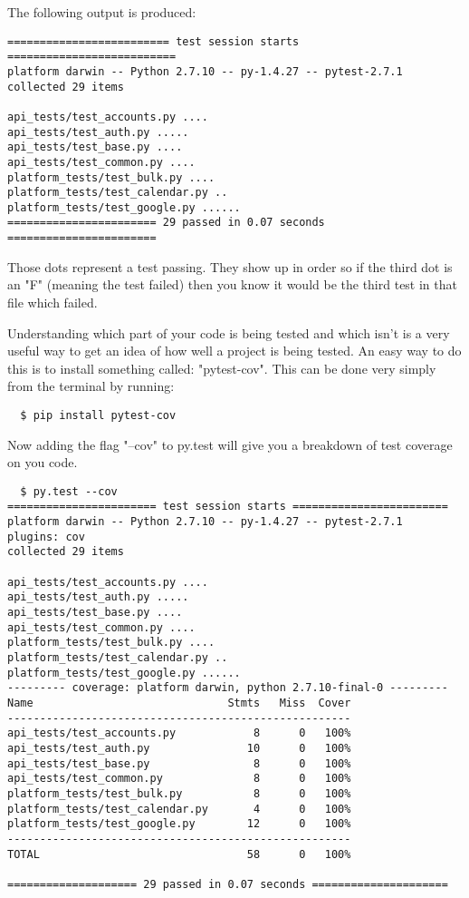 \documentclass[nociteref]{../../SIAM-GH-book}
\begin{document}
The following output is produced:

\begin{lstlisting}
========================= test session starts ==========================
platform darwin -- Python 2.7.10 -- py-1.4.27 -- pytest-2.7.1
collected 29 items

api_tests/test_accounts.py ....
api_tests/test_auth.py .....
api_tests/test_base.py ....
api_tests/test_common.py ....
platform_tests/test_bulk.py ....
platform_tests/test_calendar.py ..
platform_tests/test_google.py ......
======================= 29 passed in 0.07 seconds =======================
\end{lstlisting}
\begin{info}
Those dots represent a test passing. They show up in order so if the third dot is an "F" (meaning the test failed) then you know it would be the third test in that file which failed.
\end{info}

Understanding which part of your code is being tested and which isn't is a very useful way to get an idea of how well a project is being tested.
An easy way to do this is to install something called: "pytest-cov". This can be done very simply from the terminal by running:
\begin{lstlisting}
  $ pip install pytest-cov
\end{lstlisting}
Now adding the flag "--cov" to py.test will give you a breakdown of test coverage on you code.
\begin{lstlisting}
  $ py.test --cov
======================= test session starts ========================
platform darwin -- Python 2.7.10 -- py-1.4.27 -- pytest-2.7.1
plugins: cov
collected 29 items

api_tests/test_accounts.py ....
api_tests/test_auth.py .....
api_tests/test_base.py ....
api_tests/test_common.py ....
platform_tests/test_bulk.py ....
platform_tests/test_calendar.py ..
platform_tests/test_google.py ......
--------- coverage: platform darwin, python 2.7.10-final-0 ---------
Name                              Stmts   Miss  Cover
-----------------------------------------------------
api_tests/test_accounts.py            8      0   100%
api_tests/test_auth.py               10      0   100%
api_tests/test_base.py                8      0   100%
api_tests/test_common.py              8      0   100%
platform_tests/test_bulk.py           8      0   100%
platform_tests/test_calendar.py       4      0   100%
platform_tests/test_google.py        12      0   100%
-----------------------------------------------------
TOTAL                                58      0   100%

==================== 29 passed in 0.07 seconds =====================
\end{lstlisting}
\end{document}
